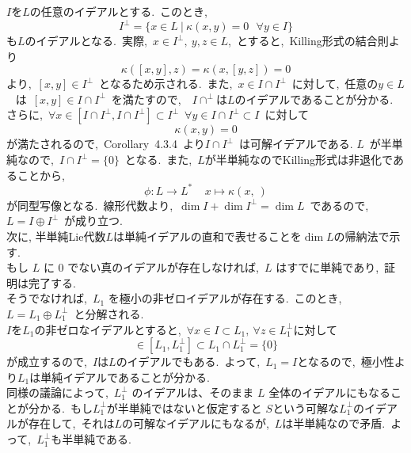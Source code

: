 \documentclass[uplatex,dvipdfmx]{jsarticle}
\begin{document}
\begin{myproof}
    $I$を$L$の任意のイデアルとする.~このとき,~
    \begin{equation*}
        I^\perp =\{ x\in L~|~\kappa(x,y)=0~~~\forall y\in I \}
    \end{equation*}
    も$L$のイデアルとなる.~実際,~$x\in I^\perp,~y,z\in L$,~とすると,~Killing形式の結合則より
    \begin{equation*}
        \kappa([x,y],z)=\kappa(x,[y,z])=0
    \end{equation*}
    より,~$[x,y]\in I^\perp$~となるため示される.~また,~$x\in I\cap I^\perp$~に対して,~任意の$y\in L$~
    は~$[x,y]\in I \cap I^\perp $~を満たすので,~~$I\cap ^\perp $は$L$のイデアルであることが分かる.\\
    さらに,~$\forall x\in [I\cap I^\perp,I\cap I^\perp]\subset I^\perp $~$\forall y\in I\cap I^\perp\subset I$~に対して
    \begin{equation*}
        \kappa(x,y)=0
    \end{equation*}
    が満たされるので,~Corollary~4.3.4~より$I\cap I^\perp$~は可解イデアルである.
    $L$~が半単純なので,~$I\cap I^\perp =\{0\}$~となる.~また,~$L$が半単純なのでKilling形式は非退化であることから,
    \begin{equation*}
        \phi:L\to L^*~~~~~x\mapsto \kappa(x,~)
    \end{equation*}
    が同型写像となる.~線形代数より,~$\dim I + \dim I^\perp =\dim L$~であるので,~$L=I\oplus I^\perp$~が成り立つ.\\
    次に, 半単純Lie代数$L$は単純イデアルの直和で表せることを$\dim L$の帰納法で示す.\\
    もし $L$ に $0$ でない真のイデアルが存在しなければ,~$L$ はすでに単純であり,~証明は完了する.\\
    そうでなければ,~$L_1$ を極小の非ゼロイデアルが存在する.~このとき,~$L=L_1 \oplus L_1^\perp$~と分解される.\\
    $I$を$L_1$の非ゼロなイデアルとすると,~$\forall x\in I\subset L_1,~\forall z\in L_1^\perp$に対して
    \begin{equation*}
        [x,z]\in [L_1,L_1^\perp]\subset L_1\cap L_1^\perp =\{0\}
    \end{equation*}
    が成立するので,~$I$は$L$のイデアルでもある.~よって,~$L_1 = I$となるので,~極小性より$L_1$は単純イデアルであることが分かる.\\
    同様の議論によって,~$L_1^\perp$ のイデアルは、そのまま $L$ 全体のイデアルにもなることが分かる.~もし$L_1^\perp$が半単純ではないと仮定すると
    $S$という可解な$L_1^\perp$のイデアルが存在して,~それは$L$の可解なイデアルにもなるが,~$L$は半単純なので矛盾.~よって,~$L_1^\perp$も半単純である.\\

\end{myproof}
\end{document}
